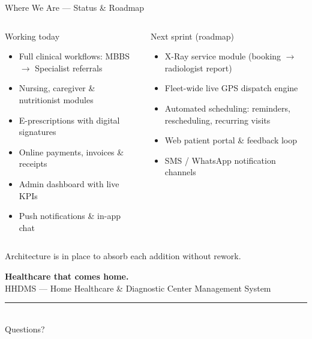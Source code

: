 \documentclass[aspectratio=169,11pt]{beamer}
\begin{document}
\begin{frame}{Where We Are --- Status \& Roadmap}
  \begin{columns}[T]
    \begin{block}{Working today}
      \begin{itemize}\small
        \item Full clinical workflows: MBBS $\rightarrow$ Specialist referrals
        \item Nursing, caregiver \& nutritionist modules
        \item E-prescriptions with digital signatures
        \item Online payments, invoices \& receipts
        \item Admin dashboard with live KPIs
        \item Push notifications \& in-app chat
      \end{itemize}
    \end{block}
    \begin{block}{Next sprint (roadmap)}
      \begin{itemize}\small
        \item X-Ray service module (booking $\rightarrow$ radiologist report)
        \item Fleet-wide live GPS dispatch engine
        \item Automated scheduling: reminders, rescheduling, recurring visits
        \item Web patient portal \& feedback loop
        \item SMS / WhatsApp notification channels
      \end{itemize}
    \end{block}
  \end{columns}
  \vfill
  {\small\color{MidGray} Architecture is in place to absorb each addition without rework.}
\end{frame}

\begin{frame}[plain]
  \centering
  \vspace{1.6cm}
  {\LARGE\textbf{Healthcare that comes home.}}\\[10pt]
  {\large HHDMS --- Home Healthcare \& Diagnostic Center Management System}\\[26pt]
  {\color{TechTeal}\rule{4cm}{3pt}}\\[24pt]
  {\Large Questions?}
  \vfill
\end{frame}
\end{document}
